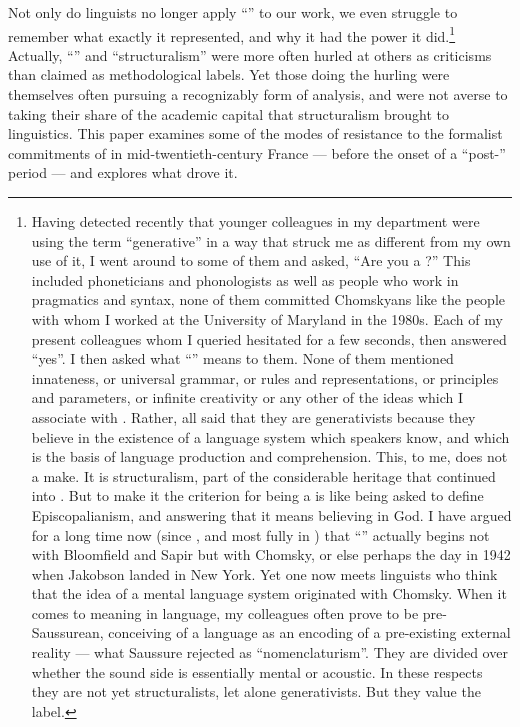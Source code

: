 \documentclass[output=paper]{langscibook}
\begin{document}
Not only do linguists no longer apply ``'' to our work, we even struggle to remember what exactly it represented, and why it had the power it did.\footnote{Having detected recently that younger colleagues in my department were using the term ``generative'' in a way that struck me as different from my own use of it, I went around to some of them and asked, ``Are you a ?'' This included phoneticians and phonologists as well as people who work in pragmatics and syntax, none of them committed Chomskyans like the people with whom I worked at the University of Maryland in the 1980s. Each of my present colleagues whom I queried hesitated for a few seconds, then answered ``yes''. I then asked what ``'' means to them. None of them mentioned innateness, or universal grammar, or rules and representations, or principles and parameters, or infinite creativity or any other of the ideas which I associate with . Rather, all said that they are generativists because they believe in the existence of a language system which speakers know, and which is the basis of language production and comprehension. This, to me, does not a  make. It is structuralism, part of the considerable  heritage that continued into . But to make it the criterion for being a  is like being asked to define Episcopalianism, and answering that it means believing in God. I have argued for a long time now (since \citealt{Joseph1999}, and most fully in \citealt{Joseph2002whitney}) that ``'' actually begins not with Bloomfield and Sapir but with Chomsky, or else perhaps the day in 1942 when Jakobson landed in New York. Yet one now meets linguists who think that the idea of a mental language system originated with Chomsky. When it comes to meaning in language, my colleagues often prove to be pre-Saussurean, conceiving of a language as an encoding of a pre-existing external reality — what Saussure rejected as ``nomenclaturism''. They are divided over whether the sound side is essentially mental or acoustic. In these respects they are not yet structuralists, let alone generativists. But they value the label.} Actually, ``'' and ``structuralism'' were more often hurled at others as criticisms than claimed as methodological labels. Yet those doing the hurling were themselves often pursuing a recognizably  form of analysis, and were not averse to taking their share of the academic capital that structuralism brought to linguistics. This paper examines some of the modes of resistance to the formalist commitments of  in mid-twentieth-century France — before the onset of a ``post-'' period — and explores what drove it.
\end{document}

